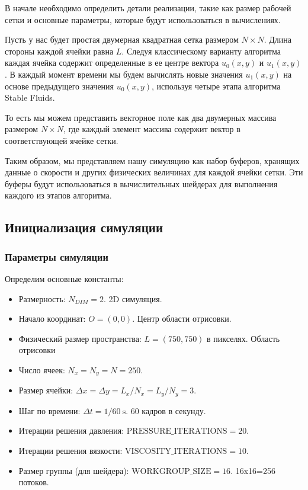 В начале необходимо определить детали реализации, такие как размер рабочей сетки и основные параметры, которые будут использоваться в вычислениях.


Пусть у нас будет простая двумерная квадратная сетка размером $N \times N$. Длина стороны каждой ячейки равна $L$. Следуя классическому варианту алгоритма каждая ячейка содержит определенные в ее центре вектора $u_0(x,y)$ и $u_1(x,y)$ \cite{stamforgames}. В каждый момент времени мы будем вычислять новые значения $u_1(x,y)$ на основе предыдущего значения $u_0(x,y)$, используя четыре этапа алгоритма Stable Fluids.

То есть мы можем представить векторное поле как два двумерных массива размером $N \times N$, где каждый элемент массива содержит вектор в соответствующей ячейке сетки.

Таким образом, мы представляем нашу симуляцию как набор буферов, хранящих данные о скорости и других физических величинах для каждой ячейки сетки. Эти буферы будут использоваться в вычислительных шейдерах для выполнения каждого из этапов алгоритма.

\subsection{Инициализация симуляции}

\subsubsection{Параметры симуляции}

Определим основные константы:

\begin{itemize}
    \item Размерность: $N_{DIM}=2$. 2D симуляция.
    \item Начало координат: $O=(0,0)$. Центр области отрисовки.
    \item Физический размер пространства: $L=(750,750)$ в пикселях. Область отрисовки
    \item Число ячеек: $N_x=N_y=N=250$.
    \item Размер ячейки: $\Delta x=\Delta y=L_x/N_x=L_y/N_y=3$.
    \item Шаг по времени: $\Delta t=1/60\ \text{s}$. 60 кадров в секунду.
    \item Итерации решения давления: $\text{PRESSURE\_ITERATIONS}=20$.
    \item Итерации решения вязкости: $\text{VISCOSITY\_ITERATIONS}=10$.
    \item Размер группы (для шейдера): $\text{WORKGROUP\_SIZE}=16$. 16x16=256 потоков.
\end{itemize}

